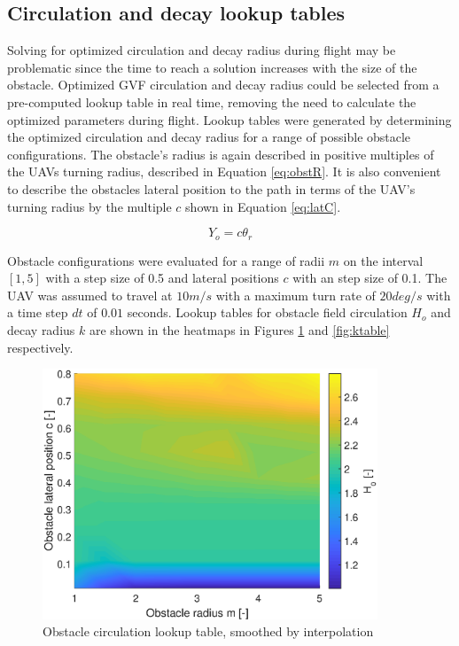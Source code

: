 \documentclass[numbered,pdftex]{ohio-etd}
\begin{document}
\subsection{Circulation and decay lookup tables}
Solving for optimized circulation and decay radius during flight may be problematic since the time to reach a solution increases with the size of the obstacle. Optimized GVF circulation and decay radius could be selected from a pre-computed lookup table in real time, removing the need to calculate the optimized parameters during flight. Lookup tables were generated by determining the optimized circulation and decay radius for a range of possible obstacle configurations. The obstacle's radius is again described in positive multiples of the UAVs turning radius, described in Equation \ref{eq:obstR}. It is also convenient to describe the obstacles lateral position to the path in terms of the UAV's turning radius by the multiple $c$ shown in Equation \ref{eq:latC}.

\begin{equation}
\label{eq:latC}
Y_o = c \theta_r
\end{equation}

Obstacle configurations were evaluated for a range of radii $m$ on the interval $[1,5]$ with a step size of 0.5 and lateral positions $c$ with an step size of 0.1. The UAV was assumed to travel at $10m/s$ with a maximum turn rate of $20 deg/s$ with a time step $dt$ of $0.01$ seconds. Lookup tables for obstacle field circulation $H_o$ and decay radius $k$ are shown in the heatmaps in Figures \ref{fig:htableheat} and \ref{fig:ktable} respectively. 

\begin{figure}[H]
	\centering
	\includegraphics[width=10cm]{PaperFigures/Methods/LookupTable/hTableHeat}
	\caption{Obstacle circulation lookup table, smoothed by interpolation}
	\label{fig:htableheat}
\end{figure}
\end{document}
